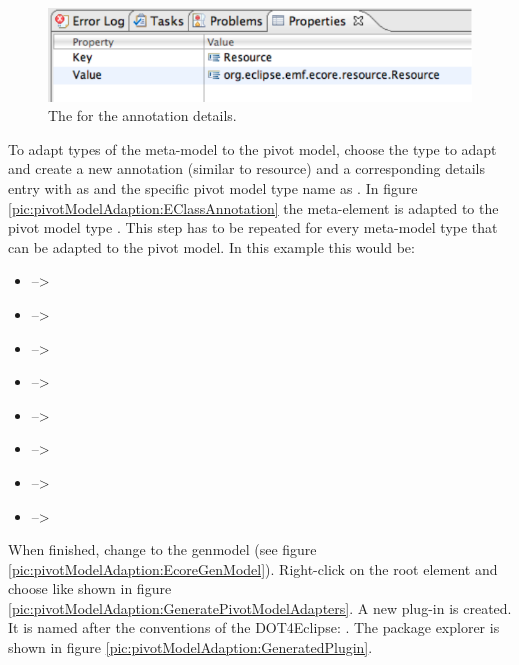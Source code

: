 \begin{figure}[!htbp]
	\centering
	\includegraphics[width=1.0\linewidth]{figures/pivotModelAdaption/AnnotationDetailsProperties}
	\caption{The  for the annotation details.}
	\label{pic:pivotModelAdaption:AnnotationDetailsProperties}
\end{figure}

To adapt types of the meta-model to the pivot model, choose the type to adapt and create a new annotation (similar to resource) and a corresponding details entry with  as  and the specific pivot model type name as . In figure \ref{pic:pivotModelAdaption:EClassAnnotation} the meta-element  is adapted to the pivot model type . This step has to be repeated for every meta-model type that can be adapted to the pivot model. In this example this would be:
\begin{itemize}
\item {} --\textgreater {}
\item {} --\textgreater {}
\item {} --\textgreater {}
\item {} --\textgreater {}
\item {} --\textgreater {}
\item {} --\textgreater {}
\item {} --\textgreater {}
\item {} --\textgreater {}
\end{itemize}

When finished, change to the genmodel (see figure \ref{pic:pivotModelAdaption:EcoreGenModel}). Right-click on the root element and choose  like shown in figure \ref{pic:pivotModelAdaption:GeneratePivotModelAdapters}. A new plug-in is created. It is named after the conventions of the \acl{DOT4Eclipse}: . The package explorer is shown in figure \ref{pic:pivotModelAdaption:GeneratedPlugin}.

